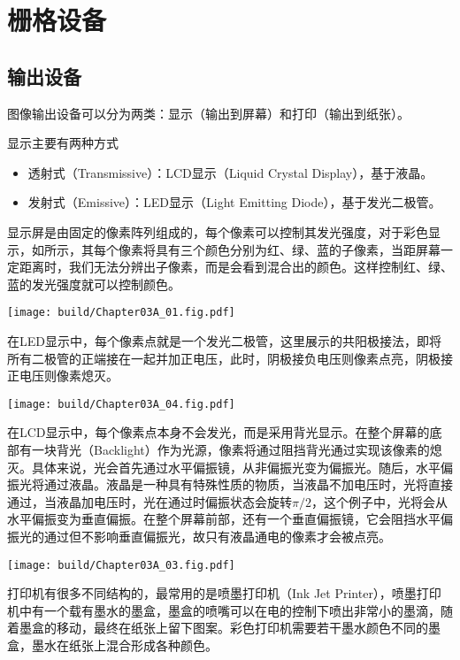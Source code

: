\section{栅格设备}

\subsection{输出设备}

图像输出设备可以分为两类：显示（输出到屏幕）和打印（输出到纸张）。

显示主要有两种方式
\begin{itemize}
    \item 透射式（Transmissive）：LCD显示（Liquid Crystal Display），基于液晶。
    \item 发射式（Emissive）：LED显示（Light Emitting Diode），基于发光二极管。
\end{itemize}
显示屏是由固定的像素阵列组成的，每个像素可以控制其发光强度，对于彩色显示，如所示，其每个像素将具有三个颜色分别为红、绿、蓝的子像素，当距屏幕一定距离时，我们无法分辨出子像素，而是会看到混合出的颜色。这样控制红、绿、蓝的发光强度就可以控制颜色。

\begin{Figure}[彩色显示的原理]
    \texttt{[image: build/Chapter03A\_01.fig.pdf]}
\end{Figure}

在LED显示中，每个像素点就是一个发光二极管，这里展示的共阳极接法，即将所有二极管的正端接在一起并加正电压，此时，阴极接负电压则像素点亮，阴极接正电压则像素熄灭。

\begin{Figure}[LED显示]
    \texttt{[image: build/Chapter03A\_04.fig.pdf]}
\end{Figure}

在LCD显示中，每个像素点本身不会发光，而是采用背光显示。在整个屏幕的底部有一块背光（Backlight）作为光源，像素将通过阻挡背光通过实现该像素的熄灭。具体来说，光会首先通过水平偏振镜，从非偏振光变为偏振光。随后，水平偏振光将通过液晶。液晶是一种具有特殊性质的物质，当液晶不加电压时，光将直接通过，当液晶加电压时，光在通过时偏振状态会旋转$\pi/2$，这个例子中，光将会从水平偏振变为垂直偏振。在整个屏幕前部，还有一个垂直偏振镜，它会阻挡水平偏振光的通过但不影响垂直偏振光，故只有液晶通电的像素才会被点亮。
\begin{Figure}[LCD显示]
    \texttt{[image: build/Chapter03A\_03.fig.pdf]}
\end{Figure}

打印机有很多不同结构的，最常用的是喷墨打印机（Ink Jet Printer），喷墨打印机中有一个载有墨水的墨盒，墨盒的喷嘴可以在电的控制下喷出非常小的墨滴，随着墨盒的移动，最终在纸张上留下图案。彩色打印机需要若干墨水颜色不同的墨盒，墨水在纸张上混合形成各种颜色。

